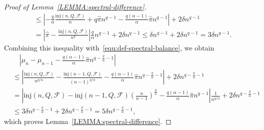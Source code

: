 \documentclass[11pt,a4paper]{article}
\begin{document}
\begin{proof}[Proof of Lemma~\ref{LEMMA:spectral-difference}]
\begin{align*}
        & \le \left|- \frac{q}{\alpha} \frac{\mathrm{inj}(n,Q,\mathcal{F})}{n} + q \hat{\pi} n^{q-1} - \frac{q(\alpha-1)}{\alpha} \hat{\pi} n^{q-1}\right| + 2\delta n^{q-1} \\
        & = \left|  \hat{\pi} - \frac{\mathrm{inj}(n,Q,\mathcal{F})}{n^{q}}  \right| \frac{q}{\alpha} n^{q-1} + 2\delta n^{q-1} 
        \le \delta n^{q-1} + 2\delta n^{q-1} 
        = 3\delta n^{q-1}. 
    \end{align*}
    Combining this inequality with~\eqref{equ:def-spectral-balance}, we obtain 
    \begin{align*}
        & \quad \left| \mu_{n} - \mu_{n-1} - \frac{q(\alpha-1)}{\alpha} \hat{\pi} n^{q-\frac{q}{\alpha}-1}\right| \\
        & \le \left|\frac{\mathrm{inj}(n,Q,\mathcal{F})}{n^{q/\alpha}} - \frac{\mathrm{inj}(n-1,Q,\mathcal{F})}{(n-1)^{q/\alpha}} - \frac{q(\alpha-1)}{\alpha} \hat{\pi} n^{q-\frac{q}{\alpha}-1}\right|  + 2 \delta n^{q - \frac{q}{\alpha} - 1} \\
        & = \left|\mathrm{inj}(n,Q,\mathcal{F}) - \mathrm{inj}(n-1,Q,\mathcal{F}) \left(\frac{n}{n-1}\right)^{\frac{q}{\alpha}} - \frac{q(\alpha-1)}{\alpha} \hat{\pi} n^{q-1}\right|\frac{1}{n^{q/\alpha}}  + 2 \delta n^{q-\frac{q}{\alpha} - 1} \\
        & \le 3 \delta n^{q - \frac{q}{\alpha} -1} + 2\delta n^{q-\frac{q}{\alpha} - 1} 
        = 5\delta n^{q-\frac{q}{\alpha} - 1}, 
    \end{align*}
    which proves Lemma~\ref{LEMMA:spectral-difference}. 
\end{proof}
\end{document}
